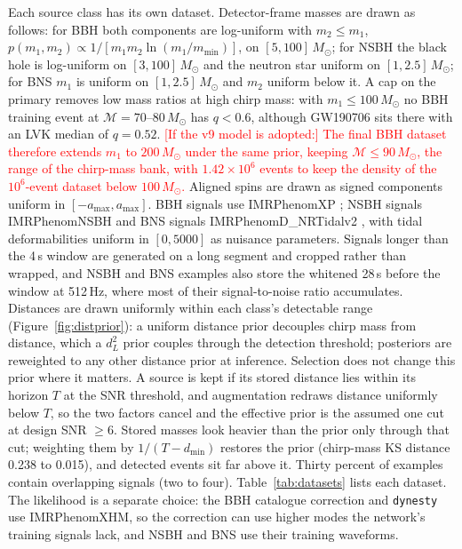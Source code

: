 \documentclass[twocolumn,linenumbers]{aastex701}
\newcommand{\pending}[1]{\textcolor{red}{#1}}
\newcommand{\msun}{M_{\odot}}
\begin{document}
Each source class has its own dataset. Detector-frame masses are drawn as
follows: for BBH both components are log-uniform with $m_2\le m_1$, $p(m_1,m_2)\propto
1/[m_1 m_2\ln(m_1/m_{\min})]$, on $[5, 100]\,\msun$; for NSBH the black hole is
log-uniform on $[3, 100]\,\msun$ and the neutron star uniform on $[1, 2.5]\,\msun$;
for BNS $m_1$ is uniform on $[1, 2.5]\,\msun$ and $m_2$ uniform below it. A cap on the
primary removes low mass ratios at high chirp mass: with $m_1\le100\,\msun$ no BBH
training event at $\mathcal{M}=70$--$80\,\msun$ has $q<0.6$, although GW190706 sits
there with an LVK median of $q=0.52$. \pending{[If the v9 model is adopted:] The final
BBH dataset therefore extends $m_1$ to $200\,\msun$ under the same prior, keeping
$\mathcal{M}\le90\,\msun$, the range of the chirp-mass bank, with $1.42\times10^6$
events to keep the density of the $10^6$-event dataset below $100\,\msun$.} Aligned spins
are drawn as signed
components uniform in $[-a_{\max}, a_{\max}]$. BBH signals use IMRPhenomXP
\citep{Pratten2020PhenomXP, PrattenXPHM}; NSBH signals IMRPhenomNSBH
\citep{Thompson2020PhenomNSBH} and BNS signals IMRPhenomD\_NRTidalv2
\citep{Dietrich2019NRTidalv2}, with tidal deformabilities uniform in
$[0, 5000]$ as nuisance parameters. Signals longer than the 4\,s window are
generated on a long segment and cropped rather than wrapped, and NSBH and BNS
examples also store the whitened 28\,s before the window at 512\,Hz, where most
of their signal-to-noise ratio accumulates. Distances are drawn uniformly
within each class's detectable range (Figure~\ref{fig:distprior}): a uniform
distance prior decouples chirp mass from distance, which a $d_L^2$ prior
couples through the detection threshold; posteriors are reweighted to any
other distance prior at inference. Selection does not change this prior where
it matters. A source is kept if its stored distance lies within its horizon $T$
at the SNR threshold, and augmentation redraws distance uniformly below $T$, so
the two factors cancel and the effective prior is the assumed one cut at design
SNR $\geq 6$. Stored masses look heavier than the prior only through that cut;
weighting them by $1/(T-d_{\min})$ restores the prior (chirp-mass KS distance
0.238 to 0.015), and detected events sit far above it. Thirty percent of examples contain
overlapping signals (two to four). Table~\ref{tab:datasets} lists each dataset. The likelihood is a separate choice:
the BBH catalogue correction and \texttt{dynesty} use IMRPhenomXHM, so the correction can
use higher modes the network's training signals lack, and NSBH and BNS use their
training waveforms.
\end{document}
